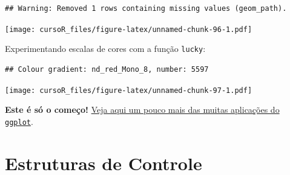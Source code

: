 \documentclass[]{book}
\newenvironment{Shaded}{\begin{snugshade}}{\end{snugshade}}
\newcommand{\KeywordTok}[1]{\textcolor[rgb]{0.13,0.29,0.53}{\textbf{#1}}}
\newcommand{\DataTypeTok}[1]{\textcolor[rgb]{0.13,0.29,0.53}{#1}}
\newcommand{\DecValTok}[1]{\textcolor[rgb]{0.00,0.00,0.81}{#1}}
\newcommand{\StringTok}[1]{\textcolor[rgb]{0.31,0.60,0.02}{#1}}
\newcommand{\CommentTok}[1]{\textcolor[rgb]{0.56,0.35,0.01}{\textit{#1}}}
\newcommand{\OperatorTok}[1]{\textcolor[rgb]{0.81,0.36,0.00}{\textbf{#1}}}
\newcommand{\NormalTok}[1]{#1}
\theoremstyle{definition}
\theoremstyle{definition}
\theoremstyle{definition}
\theoremstyle{remark}
\begin{document}
\begin{verbatim}
## Warning: Removed 1 rows containing missing values (geom_path).
\end{verbatim}

\texttt{[image: cursoR\_files/figure-latex/unnamed-chunk-96-1.pdf]}

Experimentando escalas de cores com a função \texttt{lucky}:

\begin{Shaded}
\end{Shaded}

\begin{verbatim}
## Colour gradient: nd_red_Mono_8, number: 5597
\end{verbatim}

\texttt{[image: cursoR\_files/figure-latex/unnamed-chunk-97-1.pdf]}

\textbf{Este é só o começo!}
\href{http://r-statistics.co/Top50-Ggplot2-Visualizations-MasterList-R-Code.html}{Veja
aqui um pouco mais das muitas aplicações do \texttt{ggplot}}.

\chapter{Estruturas de Controle}\label{loop}
\end{document}
